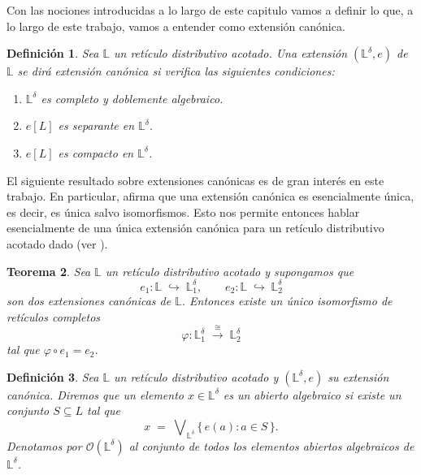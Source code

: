 \documentclass[12pt]{book}
\newtheorem{theorem}{Teorema}[section]
\newtheorem{definition}[theorem]{Definición}
\begin{document}
Con las nociones introducidas a lo largo de este capitulo vamos a definir lo que, a lo largo de este trabajo, vamos a entender como extensión canónica.


\begin{definition}\label{Def:Ext canonica} Sea $\mathbb{L}$ un retículo distributivo acotado. Una extensión $(\mathbb{L}^\delta, e)$ de $\mathbb{L}$ se dirá  \emph{extensión canónica} si verifica las siguientes condiciones:
\begin{enumerate}
    \item $\mathbb{L}^\delta$ es completo y doblemente algebraico.
    \item $e[L]$ es separante en $\mathbb{L}^\delta$.
    \item $e[L]$ es compacto en $\mathbb{L}^\delta$.
\end{enumerate}
\end{definition}

El siguiente resultado sobre extensiones canónicas es de gran interés en este trabajo. En particular, afirma que una extensión canónica es esencialmente única, es decir, es única salvo isomorfismos. Esto nos permite entonces hablar esencialmente de una única extensión canónica para un retículo distributivo acotado dado (ver \cite[Proposición 2.7]{GehrkeHarding2001}).

\begin{theorem}\label{thm:unicidad-extension-canonica}
Sea $\mathbb{L}$ un retículo distributivo acotado y supongamos que
\[
  e_1\colon \mathbb{L}\;\hookrightarrow\;\mathbb{L}_1^\delta,
  \qquad
  e_2\colon \mathbb{L}\;\hookrightarrow\;\mathbb{L}_2^\delta
\]
son dos extensiones canónicas de $\mathbb{L}$. Entonces existe un único isomorfismo de retículos completos
\[
  \varphi\colon \mathbb{L}_1^\delta \;\xrightarrow{\;\cong\;}\; \mathbb{L}_2^\delta
\]
tal que $\varphi\circ e_1 = e_2$.
\end{theorem}

\begin{definition}\label{def:abiertos}
Sea $\mathbb{L}$ un retículo distributivo acotado y $(\mathbb{L}^\delta,e)$ su extensión canónica. Diremos que un elemento $x\in\mathbb{L}^\delta$ es un \emph{abierto algebraico} si existe un conjunto $S\subseteq L$ tal que
\[
x \;=\; \bigvee\nolimits_{\mathbb{L}^\delta}\{\,e(a):a\in S\,\}.
\]
Denotamos por $\mathcal{O}(\mathbb{L}^\delta)$ al conjunto de todos los elementos abiertos algebraicos de $\mathbb{L}^\delta$.
\end{definition}
\end{document}
